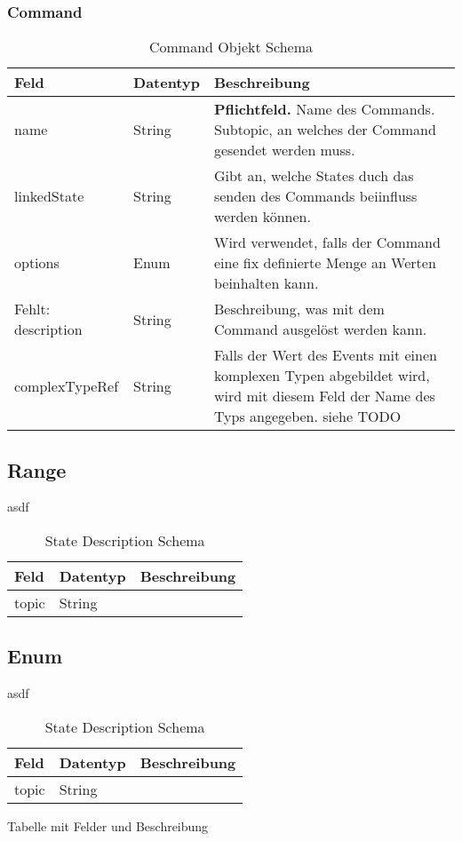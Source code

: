 \subsubsection{Command}
\begin{table}[H]
\begin{tabularx}{\textwidth}{|l|l|X|}

 \hline
 {\bf Feld } & {\bf Datentyp } & {\bf Beschreibung } \\  \hline
 
 name  &   String   &  \textbf{Pflichtfeld.} Name des Commands. Subtopic, an welches der Command gesendet werden muss. \\ \hline
 linkedState  &   String   &  Gibt an, welche States duch das senden des Commands beiinfluss werden können. \\ \hline
 options  &   Enum   &   Wird verwendet, falls der Command eine fix definierte Menge an Werten beinhalten kann. \\ \hline
 Fehlt: description  &   String   &  Beschreibung, was mit dem Command ausgelöst werden kann.  \\ \hline
 complexTypeRef  &   String   &  Falls der Wert des Events mit einen komplexen Typen abgebildet wird, wird mit diesem Feld der Name des Typs angegeben. siehe TODO  \\ \hline

\end{tabularx}
\caption{Command Objekt Schema}
\end{table}







\subsection{Range}
asdf
\begin{table}[H]
\begin{tabularx}{\textwidth}{|l|l|X|}

 \hline
 {\bf Feld } & {\bf Datentyp } & {\bf Beschreibung } \\  \hline

 topic  &   String   &    \\ \hline


\end{tabularx}
\caption{State Description Schema}
\end{table}

\subsection{Enum}
asdf
\begin{table}[H]
\begin{tabularx}{\textwidth}{|l|l|X|}

 \hline
 {\bf Feld } & {\bf Datentyp } & {\bf Beschreibung } \\  \hline

 topic  &   String   &    \\ \hline


\end{tabularx}
\caption{State Description Schema}
\end{table}

Tabelle mit Felder und Beschreibung